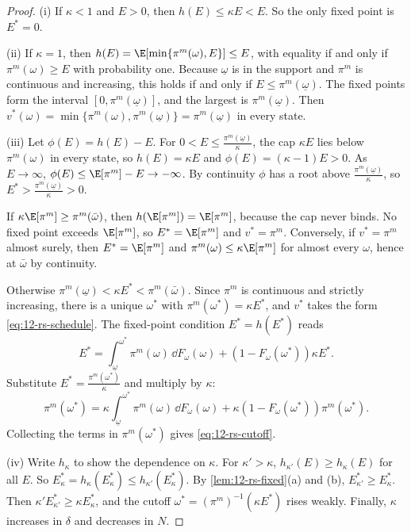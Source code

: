 \begin{proof}
(i) If $\kappa < 1$ and $E > 0$, then $h(E) \le \kappa E < E$. So the only fixed point is $E^* = 0$.

(ii) If $\kappa = 1$, then $h(E) = \E[\min\{\pi^m(\omega), E\}] \le E$, with equality if and only if $\pi^m(\omega) \ge E$
with probability one. Because $\underline\omega$ is in the support and $\pi^m$ is continuous and increasing, this
holds if and only if $E \le \pi^m(\underline\omega)$. The fixed points form the interval $[0, \pi^m(\underline\omega)]$,
and the largest is $\pi^m(\underline\omega)$. Then $v^*(\omega) = \min\{\pi^m(\omega), \pi^m(\underline\omega)\} =
\pi^m(\underline\omega)$ in every state.

(iii) Let $\phi(E) = h(E) - E$. For $0 < E \le \frac{\pi^m(\underline\omega)}{\kappa}$, the cap $\kappa E$ lies below
$\pi^m(\omega)$ in every state, so $h(E) = \kappa E$ and $\phi(E) = (\kappa - 1)E > 0$. As $E \to \infty$,
$\phi(E) \le \E[\pi^m] - E \to -\infty$. By continuity $\phi$ has a root above $\frac{\pi^m(\underline\omega)}{\kappa}$,
so $E^* > \frac{\pi^m(\underline\omega)}{\kappa} > 0$.

If $\kappa\E[\pi^m] \ge \pi^m(\bar\omega)$, then $h(\E[\pi^m]) = \E[\pi^m]$, because the cap never binds. No
fixed point exceeds $\E[\pi^m]$, so $E^* = \E[\pi^m]$ and $v^* = \pi^m$. Conversely, if $v^* = \pi^m$ almost surely,
then $E^* = \E[\pi^m]$ and $\pi^m(\omega) \le \kappa\E[\pi^m]$ for almost every $\omega$, hence at $\bar\omega$ by
continuity.

Otherwise $\pi^m(\underline\omega) < \kappa E^* < \pi^m(\bar\omega)$. Since $\pi^m$ is continuous and strictly
increasing, there is a unique $\omega^*$ with $\pi^m(\omega^*) = \kappa E^*$, and $v^*$ takes the form
\eqref{eq:12-rs-schedule}. The fixed-point condition $E^* = h(E^*)$ reads
\begin{equation*}
E^* = \int_{\underline\omega}^{\omega^*} \pi^m(\omega)\, \dd F_\omega(\omega) + \left(1 - F_\omega(\omega^*)\right)\kappa E^* .
\end{equation*}
Substitute $E^* = \frac{\pi^m(\omega^*)}{\kappa}$ and multiply by $\kappa$:
\begin{equation*}
\pi^m(\omega^*) = \kappa\int_{\underline\omega}^{\omega^*} \pi^m(\omega)\, \dd F_\omega(\omega) + \kappa\left(1 - F_\omega(\omega^*)\right)\pi^m(\omega^*).
\end{equation*}
Collecting the terms in $\pi^m(\omega^*)$ gives \eqref{eq:12-rs-cutoff}.

(iv) Write $h_\kappa$ to show the dependence on $\kappa$. For $\kappa' > \kappa$, $h_{\kappa'}(E) \ge h_\kappa(E)$ for all $E$.
So $E^*_\kappa = h_\kappa(E^*_\kappa) \le h_{\kappa'}(E^*_\kappa)$. By \cref{lem:12-rs-fixed}(a) and (b), $E^*_{\kappa'} \ge E^*_\kappa$.
Then $\kappa' E^*_{\kappa'} \ge \kappa E^*_\kappa$, and the cutoff $\omega^* = (\pi^m)^{-1}(\kappa E^*)$ rises weakly. Finally,
$\kappa$ increases in $\delta$ and decreases in $N$.
\end{proof}

